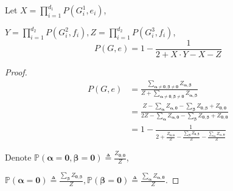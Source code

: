 \begin{lemma}
	Let $X = \prod_{i=1}^{d_1} P(G_i^1, e_i)$, 

$Y = \prod_{i=1}^{d_2} P(G_i^2, f_i), Z = \prod_{i=1}^{d_2} P(G_i^3, f_i)$,
	\begin{equation}
	P(G,e) =  1 - \frac{1}{2 + X \cdot Y - X - Z}
		\label{recursion2}
	\end{equation}

\end{lemma}
\begin{proof}

	\begin{align*}
P(G,e) &= \frac{\sum_{\boldsymbol\alpha \neq \mathbf{0}, \boldsymbol\beta \neq \mathbf{0}} Z_{\boldsymbol\alpha, \boldsymbol\beta}}{Z + \sum_{\boldsymbol\alpha \neq \mathbf{0}, \boldsymbol\beta \neq \mathbf{0}} Z_{\boldsymbol\alpha, \boldsymbol\beta}} \\
&=\frac{Z - \sum_{\boldsymbol\alpha}Z_{\boldsymbol\alpha,\mathbf{0}} - \sum_{\boldsymbol\beta} Z_{\mathbf{0}, \boldsymbol\beta} + Z_{\mathbf{0}, \mathbf{0}}}{2Z - \sum_{\boldsymbol\alpha}Z_{\boldsymbol\alpha,\mathbf{0}} - \sum_{\boldsymbol\beta} Z_{\mathbf{0}, \boldsymbol\beta} + Z_{\mathbf{0}, \mathbf{0}}} \\
&= 1 - \frac{1}{2 + \frac{Z_{\mathbf{0},\mathbf{0}}}{Z} - \frac{\sum_{\boldsymbol\beta} Z_{\mathbf{0}, \boldsymbol\beta} }{Z} - \frac{\sum_{\boldsymbol\alpha} Z_{ \boldsymbol\alpha , \mathbf{0}} }{Z}}
	\end{align*}

	Denote $\mathbb{P} \left( \boldsymbol\alpha = \mathbf{0}, \boldsymbol\beta = \mathbf{0} \right) \triangleq \frac{Z_{\mathbf{0},\mathbf{0}}}{Z}$,
 
 $\mathbb{P} \left( \boldsymbol\alpha = \mathbf{0} \right) \triangleq \frac{\sum_{\boldsymbol\beta} Z_{\mathbf{0}, \boldsymbol\beta} }{Z}, \mathbb{P} \left( \boldsymbol\beta = \mathbf{0} \right) \triangleq \frac{\sum_{\boldsymbol\alpha} Z_{ \boldsymbol\alpha , \mathbf{0}} }{Z}$.


\end{proof}
